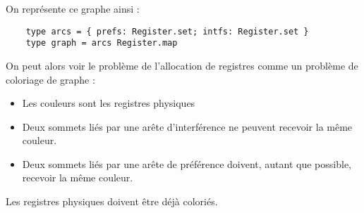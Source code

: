 \documentclass{cours}
\begin{document}
On représente ce graphe ainsi :
\begin{verbatim}
    type arcs = { prefs: Register.set; intfs: Register.set }
    type graph = arcs Register.map
\end{verbatim}

On peut alors voir le problème de l'allocation de registres comme un problème de coloriage de graphe :
\begin{itemize}
    \item Les couleurs sont les registres physiques
    \item Deux sommets liés par une arête d'interférence ne peuvent recevoir la même couleur.
    \item Deux sommets liés par une arête de préférence doivent, autant que possible, recevoir la même couleur.
\end{itemize}
Les registres physiques doivent être déjà coloriés.
\end{document}
